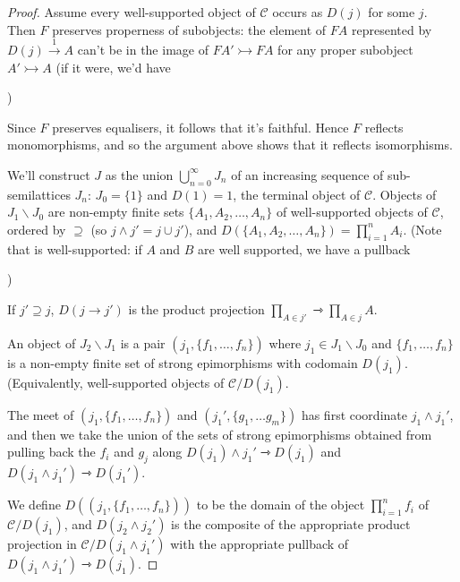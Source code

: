\documentclass[a4paper]{article}
\theoremstyle{definition}
\theoremstyle{remark}
\theoremstyle{default}
\numberwithin{definition}{section}
\begin{document}
\begin{proof}
	Assume every well-supported object of $\mathcal{C}$ occurs as $D(j)$ for some $j$.
	Then $F$ preserves properness of subobjects:
	the element of $FA$ represented by $D(j) \overset{1}{\to} A$ can't be in the image of $FA' \rightarrowtail FA$ for any proper subobject $A' \rightarrowtail A$
	(if it were, we'd have
	)
	
	Since $F$ preserves equalisers, it follows that it's faithful.
	Hence $F$ reflects monomorphisms,
	and so the argument above shows that it reflects isomorphisms.
	
	We'll construct $J$ as the union $\bigcup_{n=0}^\infty J_n$ of an increasing sequence of sub-semilattices $J_n$:
	$J_0 = \{1\}$ and $D(1) = 1$,
	the terminal object of $\mathcal{C}$.
	Objects of $J_1 \backslash J_0$ are non-empty finite sets $\{A_1, A_2, \dots, A_n \}$ of well-supported objects of $\mathcal{C}$,
	ordered by  $\supseteq$ (so $j \wedge j' = j \cup j'$),
	and $D(\{A_1, A_2, \dots, A_n \}) = \prod_{i=1}^n A_i$.
	(Note that is well-supported: if $A$ and $B$ are well supported, we have a pullback
	)
	
	If $j' \supseteq j$, $D(j \to j')$ is the product projection $\prod_{A \in j'} \rightarrowtriangle \prod_{A \in j} A$.
	
	An object of $J_2 \backslash J_1$ is a pair $(j_1, \{f_1, \dots, f_n\})$
	where $j_1 \in J_1 \backslash J_0$ and $\{f_1, \dots, f_n\}$ is a non-empty finite set of strong epimorphisms with codomain $D(j_1)$.
	(Equivalently, well-supported objects of $\mathcal{C}/D(j_1)$.
	
	The meet of $(j_1, \{f_1, \dots, f_n\})$ and $(j_1', \{g_1, \dots g_m\})$ has first coordinate $j_1 \wedge j_1'$,
	and then we take the union of the sets of strong epimorphisms obtained from pulling back the $f_i$ and $g_j$
	along $D(j_1) \wedge j_1' \rightarrowtriangle D(j_1)$ and $D(j_1 \wedge j_1') \rightarrowtriangle D(j_1')$.
	
	We define $D((j_1, \{f_1, \dots, f_n\}))$ to be the domain of the object $\prod_{i=1}^n f_i$ of $\mathcal{C}/D(j_1)$,
	and $D(j_2 \wedge j_2')$ is the composite of the appropriate product projection in $\mathcal{C}/D(j_1 \wedge j_1')$
	with the appropriate pullback of $D(j_1 \wedge j_1') \rightarrowtriangle D(j_1)$.
	

\end{proof}
\end{document}
